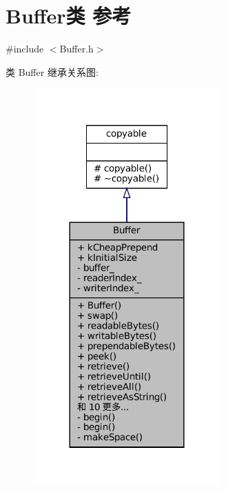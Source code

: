 \hypertarget{classmuduo_1_1Buffer}{}\section{Buffer类 参考}
\label{classmuduo_1_1Buffer}


{\ttfamily \#include $<$Buffer.\+h$>$}



类 Buffer 继承关系图\+:
\nopagebreak
\begin{figure}[H]
\begin{center}
\leavevmode
\includegraphics[width=204pt]{classmuduo_1_1Buffer__inherit__graph}
\end{center}
\end{figure}


